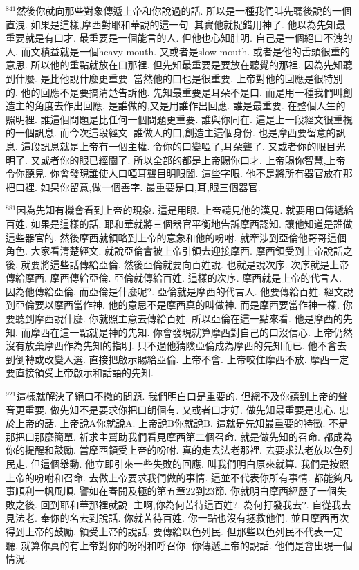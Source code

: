 \documentclass{book}
\begin{document}
$^{841}$然後你就向那些對象傳遞上帝和你說過的話.
所以是一種我們叫先聽後說的一個直洩.
如果是這樣,摩西對耶和華說的這一句.
其實他就捉錯用神了.
他以為先知最重要就是有口才.
最重要是一個能言的人.
但他也心知肚明.
自己是一個絕口不洩的人.
而文積益就是一個heavy mouth.
又或者是slow mouth.
或者是他的舌頭很重的意思.
所以他的重點就放在口那裡.
但先知最重要是要放在聽覺的那裡.
因為先知聽到什麼.
是比他說什麼更重要.
當然他的口也是很重要.
上帝對他的回應是很特別的.
他的回應不是要搞清楚告訴他.
先知最重要是耳朵不是口.
而是用一種我們叫創造主的角度去作出回應.
是誰做的,又是用誰作出回應.
誰是最重要.
在整個人生的照明裡.
誰這個問題是比任何一個問題更重要.
誰與你同在.
這是上一段經文很重視的一個訊息.
而今次這段經文.
誰做人的口,創造主這個身份.
也是摩西要留意的訊息.
這段訊息就是上帝有一個主權.
令你的口變啞了,耳朵聾了.
又或者你的眼目光明了.
又或者你的眼已經闔了.
所以全部的都是上帝賜你口才.
上帝賜你智慧,上帝令你聽見.
你會發現誰使人口啞耳聾目明眼闔.
這些字眼.
他不是將所有器官放在那把口裡.
如果你留意,做一個善字.
最重要是口,耳,眼三個器官.

$^{881}$因為先知有機會看到上帝的現象.
這是用眼.
上帝聽見他的漢見.
就要用口傳遞給百姓.
如果是這樣的話.
耶和華就將三個器官平衡地告訴摩西認知.
讓他知道是誰做這些器官的.
然後摩西就領略到上帝的意象和他的吩咐.
就牽涉到亞倫他哥哥這個角色.
大家看清楚經文.
就說亞倫會被上帝引領去迎接摩西.
摩西領受到上帝說話之後.
就要將這些話傳給亞倫.
然後亞倫就要向百姓說.
也就是說次序.
次序就是上帝傳給摩西.
摩西傳給亞倫.
亞倫就傳給百姓.
這樣的次序.
摩西就是上帝的代言人.
因為他傳給亞倫.
而亞倫是什麼呢?.
亞倫就是摩西的代言人.
他要傳給百姓.
經文說到亞倫要以摩西當作神.
他的意思不是摩西真的叫做神.
而是摩西要當作神一樣.
你要聽到摩西說什麼.
你就照主意去傳給百姓.
所以亞倫在這一點來看.
他是摩西的先知.
而摩西在這一點就是神的先知.
你會發現就算摩西對自己的口沒信心.
上帝仍然沒有放棄摩西作為先知的指明.
只不過他猜險亞倫成為摩西的先知而已.
他不會去到倒轉或改變人選.
直接把啟示賜給亞倫.
上帝不會.
上帝咬住摩西不放.
摩西一定要直接領受上帝啟示和話語的先知.

$^{921}$這樣就解決了絕口不撒的問題.
我們明白口是重要的.
但總不及你聽到上帝的聲音更重要.
做先知不是要求你把口朗個有.
又或者口才好.
做先知最重要是忠心.
忠於上帝的話.
上帝說A你就說A.
上帝說B你就說B.
這就是先知最重要的特徵.
不是那把口那麼簡單.
祈求主幫助我們看見摩西第二個召命.
就是做先知的召命.
都成為你的提醒和鼓勵.
當摩西領受上帝的吩咐.
真的走去法老那裡.
去要求法老放以色列民走.
但這個舉動.
他立即引來一些失敗的回應.
叫我們明白原來就算.
我們是按照上帝的吩咐和召命.
去做上帝要求我們做的事情.
這並不代表你所有事情.
都能夠凡事順利一帆風順.
譬如在春開及極的第五章22到23節.
你就明白摩西經歷了一個失敗之後.
回到耶和華那裡就說.
主啊,你為何苦待這百姓?.
為何打發我去?.
自從我去見法老.
奉你的名去到說話.
你就苦待百姓.
你一點也沒有拯救他們.
並且摩西再次得到上帝的鼓勵.
領受上帝的說話.
要傳給以色列民.
但那些以色列民不代表一定聽.
就算你真的有上帝對你的吩咐和呼召你.
你傳遞上帝的說話.
他們是會出現一個情況.
\end{document}
